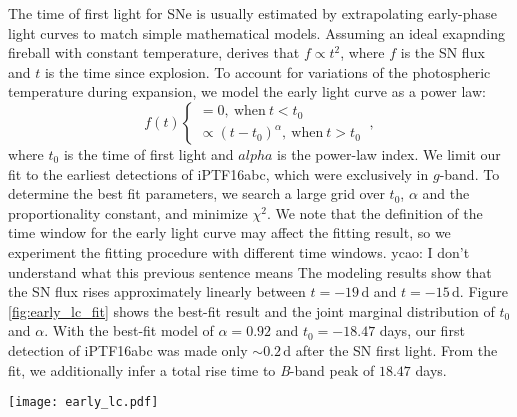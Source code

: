 \documentclass[twocolumn]{aastex61}
\newcommand{\ycao}[1]{{\color{red} ycao: {#1}}}
\begin{document}
The time of first light for SNe is usually estimated by 
extrapolating early-phase light curves to match simple 
mathematical models. Assuming an ideal exapnding fireball with 
constant temperature, \citet{1982ApJ...253..785A} derives that $f 
\propto t^2$, where $f$ is the SN flux and $t$ is the time since 
explosion. To account for variations of the photospheric 
temperature during expansion, we model the early light curve as a power law:
\begin{equation}
  \label{eq:broken_power_law}
  f(t) \left\{
    \begin{array}{ll}
      = 0,\ \textrm{when}\ t<t_0 \\
      \propto (t-t_0)^{\alpha},\ \textrm{when}\ t>t_0
    \end{array}
  \right.\ ,
\end{equation}
where $t_0$ is the time of first light and $alpha$ is the power-law index. We limit our fit to the earliest detections of iPTF16abc, which were exclusively in $g$-band. To determine the best fit parameters, we search a large grid over $t_0$, $\alpha$
and the proportionality constant, and minimize $\chi^2$. 
We note that the definition of
the time window for the early light curve may affect the fitting
result, so we experiment the fitting procedure with different time
windows. \ycao{I don't understand what this previous sentence means}
The modeling results show that the SN flux rises approximately
linearly between
$t=-19\,\textrm{d}$ and $t=-15\,\textrm{d}$. Figure \ref{fig:early_lc_fit} shows the best-fit result and
the joint marginal distribution of $t_0$ and $\alpha$. With the
best-fit model of $\alpha=0.92$ and $t_0=-18.47$ days, our first
detection of iPTF16abc was made only $\sim{0.2}\,\textrm{d}$ after 
the SN first light. From the fit, we additionally infer a total rise time to \textit{B}-band peak of $18.47$
days.

\begin{figure*}[htb]
  \centering
  \texttt{[image: early\_lc.pdf]}
  \caption{Broken Power low fitting to the early $g$-band light
    curve. The best-fit model of $\alpha=0.92$ and $t_0=-18.47\,\textrm{days}$
    and corresponding residues are shown in the top and bottom panels, respectively.
    The joint distribution of $t_0$ and $\alpha$ is illustrated in the inset of
    the upper panel. The solid and dashed contours represent the $68\%$ and $99.7\%$
    confidence levels.
  }
  \label{fig:early_lc_fit}
\end{figure*}
\end{document}
